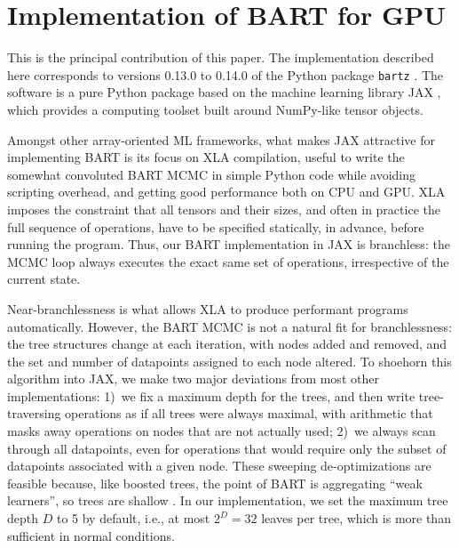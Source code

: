 \documentclass{article}
\newcommand{\redactedcite}[1]{#1}
\begin{document}
\section{Implementation of BART for GPU}
\label{sec:impl}

This is the principal contribution of this paper. The implementation described
here corresponds to versions 0.13.0 to 0.14.0 of the Python package \texttt{bartz}
\redactedcite{\citep{gattocrucco_2026_23932737}}. The software is a pure Python
package based on the machine learning library JAX \citep{bradbury2018}, which
provides a computing toolset built around NumPy-like \citep{harris2020} tensor
objects.

Amongst other array-oriented ML frameworks, what makes JAX attractive for
implementing BART is its focus on XLA compilation, useful to write the somewhat
convoluted BART MCMC in simple Python code while avoiding scripting overhead,
and getting good performance both on CPU and GPU. XLA imposes the constraint
that all tensors and their sizes, and often in practice the full sequence of
operations, have to be specified statically, in advance, before running the
program. Thus, our BART implementation in JAX is branchless: the MCMC loop
always executes the exact same set of operations, irrespective of the current
state.

Near-branchlessness is what allows XLA to produce performant programs
automatically. However, the BART MCMC is not a natural fit for branchlessness:
the tree structures change at each iteration, with nodes added and removed, and
the set and number of datapoints assigned to each node altered. To shoehorn
this algorithm into JAX, we make two major deviations from most other
implementations: 1)~we fix a maximum depth for the trees, and then write
tree-traversing operations as if all trees were always maximal, with arithmetic
that masks away operations on nodes that are not actually used; 2)~we always
scan through all datapoints, even for operations that would require only the
subset of datapoints associated with a given node. These sweeping
de-optimizations are feasible because, like boosted trees, the point of BART is
aggregating ``weak learners'', so trees are shallow \citep[see,
e.g.,][\S6]{chipman2010}. In our implementation, we set the maximum tree depth
$D$ to 5 by default, i.e., at most $2^D = 32$ leaves per tree, which is more
than sufficient in normal conditions.
\end{document}
